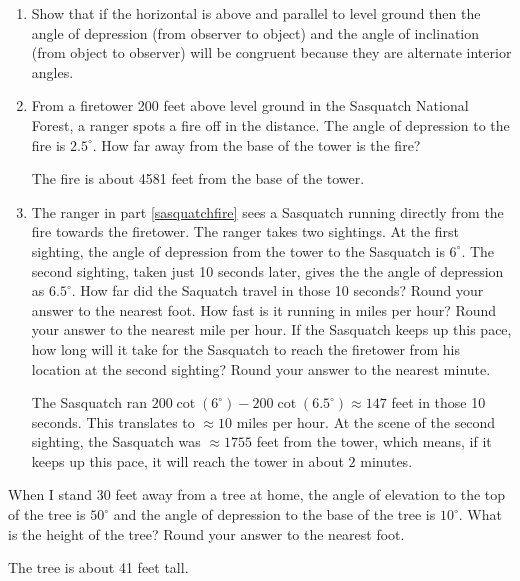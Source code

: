 \documentclass{ximera}
\begin{document}
\begin{problem}
\begin{enumerate}

\item Show that if the horizontal is above and parallel to level ground then the angle of depression (from observer to object) and the angle of inclination (from object to observer) will be congruent because they are alternate interior angles.



\item \label{sasquatchfire} From a firetower 200 feet above level ground in the Sasquatch National Forest, a ranger spots a fire off in the distance.  The angle of depression to the fire is $2.5^{\circ}$.  How far away from the base of the tower is the fire?

\begin{solution}
The fire is about 4581 feet from the base of the tower.
\end{solution}

\item  The ranger in part \ref{sasquatchfire} sees a Sasquatch running directly from the fire towards the firetower.  The ranger takes two sightings.  At the first sighting, the angle of depression from the tower to the Sasquatch is $6^{\circ}$.  The second sighting, taken just 10 seconds later, gives the the angle of depression as $6.5^{\circ}$.  How far did the Saquatch travel in those 10 seconds?  Round your answer to the nearest foot.  How fast is it running in miles per hour? Round your answer to the nearest mile per hour.  If the Sasquatch keeps up this pace, how long will it take for the Sasquatch to reach the firetower from his location at the second sighting?  Round your answer to the nearest minute.

\begin{solution}
The Sasquatch ran $200\cot(6^{\circ}) - 200\cot(6.5^{\circ}) \approx 147$ feet in those 10 seconds. This translates to $\approx 10$ miles per hour.  At the scene of the second sighting, the Sasquatch was $\approx 1755$ feet from the tower, which means, if it keeps up this pace, it will reach the tower in about $2$ minutes.
\end{solution}

\end{enumerate}

\end{problem}

\begin{problem}
When I stand 30 feet away from a tree at home, the angle of elevation to the top of the tree is $50^{\circ}$ and the angle of depression to the base of the tree is $10^{\circ}$.  What is the height of the tree?  Round your answer to the nearest foot.

\begin{solution}
The tree is about 41 feet tall.
\end{solution}
\end{problem}
\end{document}
